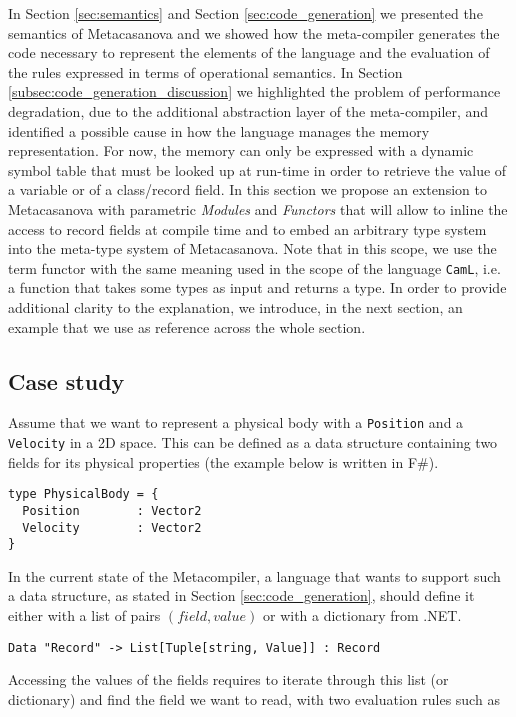 In Section \ref{sec:semantics} and Section \ref{sec:code_generation} we presented the semantics of Metacasanova and we showed how the meta-compiler generates the code necessary to represent the elements of the language and the evaluation of the rules expressed in terms of operational semantics. In Section \ref{subsec:code_generation_discussion} we highlighted the problem of performance degradation, due to the additional abstraction layer of the meta-compiler, and identified a possible cause in how the language manages the memory representation. For now, the memory can only be expressed with a dynamic symbol table that must be looked up at run-time in order to retrieve the value of a variable or of a class/record field. In this section we propose an extension to Metacasanova with parametric \textit{Modules} and \textit{Functors} that will allow to inline the access to record fields at compile time and to embed an arbitrary type system into the meta-type system of Metacasanova. Note that in this scope, we use the term functor with the same meaning used in the scope of the language \texttt{CamL}, i.e. a function that takes some types as input and returns a type. In order to provide additional clarity to the explanation, we introduce, in the next section, an example that we use as reference across the whole section.

\subsection{Case study}
Assume that we want to represent a physical body with a \texttt{Position} and a \texttt{Velocity} in a 2D space. This can be defined as a data structure containing two fields for its physical properties (the example below is written in F\#). 

\begin{lstlisting}
type PhysicalBody = {
  Position        : Vector2
  Velocity        : Vector2
}
\end{lstlisting}

In the current state of the Metacompiler, a language that wants to support such a data structure, as stated in Section \ref{sec:code_generation}, should define it either with a list of pairs $(field,value)$ or with a dictionary from .NET.

\begin{lstlisting}
Data "Record" -> List[Tuple[string, Value]] : Record
\end{lstlisting} 

Accessing the values of the fields requires to iterate through this list (or dictionary) and find the field we want to read, with two evaluation rules such as


